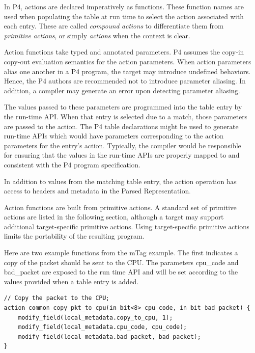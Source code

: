 \documentclass[12pt]{article}
\begin{document}

In P4, actions are declared imperatively as functions. These function
names are used when populating the table at run time to select the
action associated with each entry. These are called \textit{compound
actions} to differentiate them from \textit{primitive actions}, or
simply \textit{actions} when the context is clear.

Action functions take typed and annotated parameters. P4 assumes the
copy-in copy-out evaluation semantics for the action parameters. When 
action parameters alias one another in a P4 program, the target may
introduce undefined behaviors. Hence, the P4 authors are recommended
not to introduce parameter aliasing. In addition, a compiler may
generate an error upon detecting parameter aliasing.

The values passed to these parameters are programmed into the table entry 
by the run-time API. When that entry is selected due to a match, those 
parameters are passed to the action. The P4 table declarations might be used to
generate run-time APIs which would have parameters corresponding to
the action parameters for the entry's action. Typically, the compiler
would be responsible for ensuring that the values in the run-time APIs
are properly mapped to and consistent with the P4 program
specification.

In addition to values from the matching table entry, the action operation 
has access to headers and metadata in the Parsed Representation.

Action functions are built from primitive actions. A standard set of
primitive actions are listed in the following section, although a
target may support additional target-specific primitive actions. Using
target-specific primitive actions limits the portability of the resulting
program.

Here are two example functions from the mTag example.  The first indicates 
a copy of the packet should be sent to the CPU.  The parameters cpu_code 
and bad_packet are exposed to the run time API and will be set according 
to the values provided when a table entry is added.

\begin{lstlisting}[style=P4style]
// Copy the packet to the CPU;
action common_copy_pkt_to_cpu(in bit<8> cpu_code, in bit bad_packet) {
    modify_field(local_metadata.copy_to_cpu, 1);
    modify_field(local_metadata.cpu_code, cpu_code);
    modify_field(local_metadata.bad_packet, bad_packet);
}
\end{lstlisting}
\end{document}
